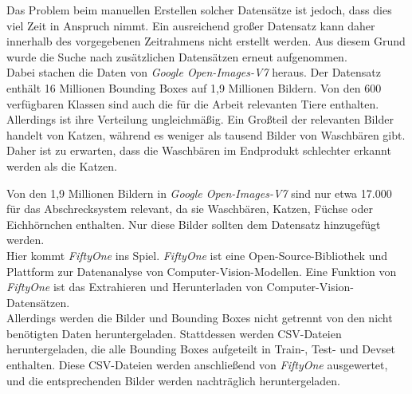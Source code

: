 Das Problem beim manuellen Erstellen solcher Datensätze ist jedoch, dass dies viel Zeit in Anspruch nimmt. Ein ausreichend großer Datensatz kann daher innerhalb des vorgegebenen Zeitrahmens nicht erstellt werden. Aus diesem Grund wurde die Suche nach zusätzlichen Datensätzen erneut aufgenommen.
\\
Dabei stachen die Daten von \textit{Google Open-Images-V7} heraus. Der Datensatz enthält 16 Millionen Bounding Boxes auf 1,9 Millionen Bildern. Von den 600 verfügbaren Klassen sind auch die für die Arbeit relevanten Tiere enthalten. Allerdings ist ihre Verteilung ungleichmäßig. Ein Großteil der relevanten Bilder handelt von Katzen, während es weniger als tausend Bilder von Waschbären gibt. Daher ist zu erwarten, dass die Waschbären im Endprodukt schlechter erkannt werden als die Katzen. \cite{google_oi7}

Von den 1,9 Millionen Bildern in \textit{Google Open-Images-V7} sind nur etwa 17.000 für das Abschrecksystem relevant, da sie Waschbären, Katzen, Füchse oder Eichhörnchen enthalten. Nur diese Bilder sollten dem Datensatz hinzugefügt werden.
\\
Hier kommt \textit{FiftyOne} ins Spiel. \textit{FiftyOne} ist eine Open-Source-Bibliothek und Plattform zur Datenanalyse von Computer-Vision-Modellen. Eine Funktion von \textit{FiftyOne} ist das Extrahieren und Herunterladen von Computer-Vision-Datensätzen.
\\
Allerdings werden die Bilder und Bounding Boxes nicht getrennt von den nicht benötigten Daten heruntergeladen. Stattdessen werden CSV-Dateien heruntergeladen, die alle Bounding Boxes aufgeteilt in Train-, Test- und Devset enthalten. Diese CSV-Dateien werden anschließend von \textit{FiftyOne} ausgewertet, und die entsprechenden Bilder werden nachträglich heruntergeladen. \cite{fiftyone}

